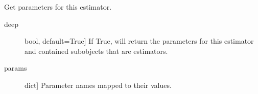 \documentclass[letterpaper,10pt,english]{sphinxmanual}
\begin{document}
\begin{fulllineitems}
\begin{fulllineitems}
\label{\detokenize{api/mastml.models.SklearnModel:mastml.models.SklearnModel.fit}}
\end{fulllineitems}


\begin{fulllineitems}
\label{\detokenize{api/mastml.models.SklearnModel:mastml.models.SklearnModel.get_params}}
Get parameters for this estimator.
\begin{description}
\item[{deep}] \leavevmode{[}bool, default=True{]}
If True, will return the parameters for this estimator and
contained subobjects that are estimators.

\end{description}
\begin{description}
\item[{params}] \leavevmode{[}dict{]}
Parameter names mapped to their values.

\end{description}

\end{fulllineitems}


\begin{fulllineitems}
\label{\detokenize{api/mastml.models.SklearnModel:mastml.models.SklearnModel.help}}
\end{fulllineitems}


\begin{fulllineitems}
\label{\detokenize{api/mastml.models.SklearnModel:mastml.models.SklearnModel.predict}}
\end{fulllineitems}


\end{fulllineitems}
\end{document}
